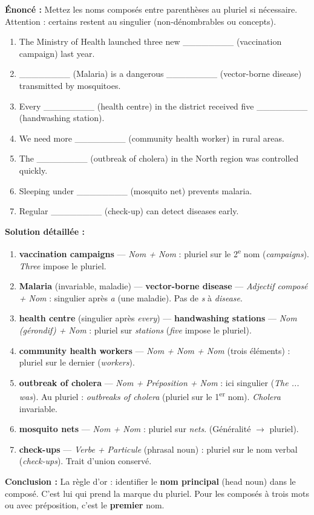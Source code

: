 \documentclass[11pt]{article}
\begin{document}
\begin{exoresolu}
\textbf{Énoncé :} Mettez les noms composés entre parenthèses au pluriel si nécessaire. Attention : certains restent au singulier (non-dénombrables ou concepts).

\begin{enumerate}
    \item The Ministry of Health launched three new \_\_\_\_\_\_\_\_ (vaccination campaign) last year.
    \item \_\_\_\_\_\_\_\_ (Malaria) is a dangerous \_\_\_\_\_\_\_\_ (vector-borne disease) transmitted by mosquitoes.
    \item Every \_\_\_\_\_\_\_\_ (health centre) in the district received five \_\_\_\_\_\_\_\_ (handwashing station).
    \item We need more \_\_\_\_\_\_\_\_ (community health worker) in rural areas.
    \item The \_\_\_\_\_\_\_\_ (outbreak of cholera) in the North region was controlled quickly.
    \item Sleeping under \_\_\_\_\_\_\_\_ (mosquito net) prevents malaria.
    \item Regular \_\_\_\_\_\_\_\_ (check-up) can detect diseases early.
\end{enumerate}

\tcblower
\textbf{Solution détaillée :}
\begin{enumerate}
    \item \textbf{vaccination campaigns} — \emph{Nom + Nom} : pluriel sur le 2\textsuperscript{e} nom (\emph{campaigns}). \emph{Three} impose le pluriel.
    \item \textbf{Malaria} (invariable, maladie) — \textbf{vector-borne disease} — \emph{Adjectif composé + Nom} : singulier après \emph{a} (une maladie). Pas de \emph{s} à \emph{disease}.
    \item \textbf{health centre} (singulier après \emph{every}) — \textbf{handwashing stations} — \emph{Nom (gérondif) + Nom} : pluriel sur \emph{stations} (\emph{five} impose le pluriel).
    \item \textbf{community health workers} — \emph{Nom + Nom + Nom} (trois éléments) : pluriel sur le dernier (\emph{workers}).
    \item \textbf{outbreak of cholera} — \emph{Nom + Préposition + Nom} : ici singulier (\emph{The ... was}). Au pluriel : \emph{outbreaks of cholera} (pluriel sur le 1\textsuperscript{er} nom). \emph{Cholera} invariable.
    \item \textbf{mosquito nets} — \emph{Nom + Nom} : pluriel sur \emph{nets}. (Généralité $\rightarrow$ pluriel).
    \item \textbf{check-ups} — \emph{Verbe + Particule} (phrasal noun) : pluriel sur le nom verbal (\emph{check-ups}). Trait d'union conservé.
\end{enumerate}
\textbf{Conclusion :} La règle d'or : identifier le \textbf{nom principal} (head noun) dans le composé. C'est lui qui prend la marque du pluriel. Pour les composés à trois mots ou avec préposition, c'est le \textbf{premier} nom.
\end{exoresolu}
\end{document}
